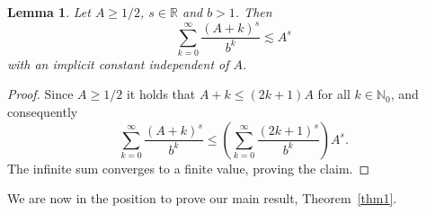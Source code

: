 \documentclass[12pt, a4paper]{article}
\newtheorem{lem}[thm]{Lemma}
\newcommand{\peter}[1]{\begingroup\color{violet}#1\endgroup}
\newcommand{\bbR}{{\mathbb{R}}}
\newcommand{\bbN}{{\mathbb{N}}}
\begin{document}
\begin{lem} \label{lem:A_1/2}
    Let $A \geq 1/2$, $s \in \bbR$ and $b > 1$. Then
    $$
    \sum_{k=0}^\infty \frac{(A+k)^s}{b^k} \lesssim A^s
    $$
    with an implicit constant independent of $A$.
\end{lem}

\begin{proof}
    Since $A \geq 1/2$ it holds \peter{that} $A+k \leq (2k+1) A$ for all $k \in \bbN_0$, and consequently
    $$
    \sum_{k=0}^\infty \frac{(A+k)^s}{b^k} \leq \left(\sum_{k=0}^\infty \frac{(2k+1)^s}{b^k}\right) A^s.
    $$
    The infinite sum converges to a finite value, proving the claim.
\end{proof}


We are now in the position to prove our main result, Theorem~\ref{thm1}.
\end{document}
